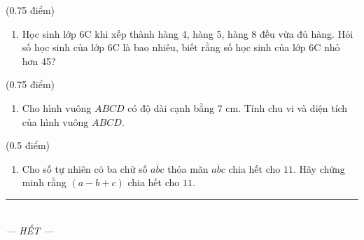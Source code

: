 \documentclass[12pt,a4paper]{article}
\begin{document}
\begin{ex} (0.75 điểm)
\begin{enumerate}[label=\textbf{\alph*)}, leftmargin=0.8cm, itemsep=2pt]
\item Học sinh lớp 6C khi xếp thành hàng 4, hàng 5, hàng 8 đều vừa đủ hàng. Hỏi số học sinh của lớp 6C là bao nhiêu, biết rằng số học sinh của lớp 6C nhỏ hơn 45?
\end{enumerate}
\end{ex}
\vspace{1.5mm}

\begin{ex} (0.75 điểm)
\begin{enumerate}[label=\textbf{\alph*)}, leftmargin=0.8cm, itemsep=2pt]
\item Cho hình vuông $ABCD$ có độ dài cạnh bằng $7\text{ cm}$. Tính chu vi và diện tích của hình vuông $ABCD$.
\end{enumerate}
\end{ex}
\vspace{1.5mm}

\begin{ex} (0.5 điểm)
\begin{enumerate}[label=\textbf{\alph*)}, leftmargin=0.8cm, itemsep=2pt]
\item Cho số tự nhiên có ba chữ số $\overline{abc}$ thỏa mãn $\overline{abc}$ chia hết cho $11$. Hãy chứng minh rằng $(a - b + c)$ chia hết cho $11$.
\end{enumerate}
\end{ex}
\vspace{1.5mm}


\begin{center}
\rule{4cm}{0.4pt}\\
\textit{--- HẾT ---}
\end{center}
\end{document}
